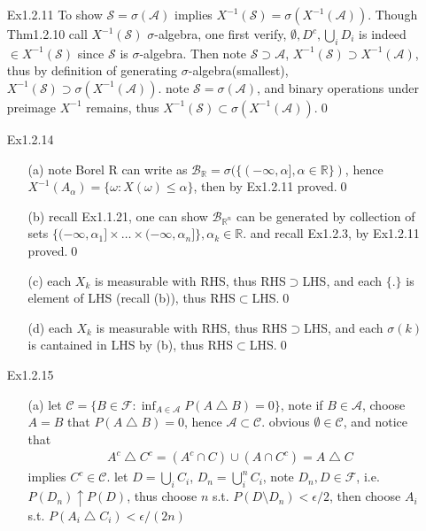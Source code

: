\documentclass[paper=a4, fontsize=11pt]{scrartcl} %
\numberwithin{equation}{section} %
\numberwithin{figure}{section} %
\numberwithin{table}{section} %
\begin{document}
\begin{itemize}
	 \item[Ex1.2.11] To show $\mathcal{S}=\sigma(\mathcal{A})$ implies $X^{-1}(\mathcal{S})=\sigma(X^{-1}(\mathcal{A}))$. Though Thm1.2.10 call $X^{-1}(\mathcal{S})$ $\sigma$-algebra, one first verify, $\emptyset,D^c,\bigcup_i D_i$ is indeed $\in X^{-1}(\mathcal{S})$ since $\mathcal{S}$ is $\sigma$-algebra. Then note $\mathcal{S}\supset \mathcal{A}$, $X^{-1}(\mathcal{S}) \supset X^{-1}(\mathcal{A})$, thus by definition of generating $\sigma$-algebra(smallest), $X^{-1}(\mathcal{S}) \supset \sigma(X^{-1}(\mathcal{A}))$. note $\mathcal{S}=\sigma(\mathcal{A})$, and binary operations under preimage $X^{-1}$ remains, thus $X^{-1}(\mathcal{S}) \subset \sigma(X^{-1}(\mathcal{A}))$.\qed
	 \item[Ex1.2.14]
	 \begin{itemize}
	 	\item[(a)] note Borel R can write as $\mathcal{B}_{\mathbb{R}}= \sigma(\{(-\infty,\alpha],\alpha\in \mathbb{R}\})$, hence $X^{-1}(A_\alpha) = \{\omega:X(\omega)\leq \alpha\}$, then by Ex1.2.11 proved.\qed
	 	\item[(b)] recall Ex1.1.21, one can show $\mathcal{B}_{\mathbb{R}^n}$ can be generated by collection of sets $\{(-\infty,\alpha_1]\times\dots\times(-\infty,\alpha_n]\},\alpha_k\in \mathbb{R}$. and recall Ex1.2.3, by Ex1.2.11 proved.\qed
	 	\item[(c)] each $X_k$ is measurable with RHS, thus RHS$\supset$LHS, and each $\{.\}$ is element of LHS (recall (b)), thus RHS$\subset$LHS.\qed
	 	\item[(d)] each $X_k$ is measurable with RHS, thus RHS$\supset$LHS, and each $\sigma(k)$ is cantained in LHS by (b), thus RHS$\subset$LHS.\qed
	 \end{itemize}
	 \item[Ex1.2.15]
	 \begin{itemize}
	 	\item[(a)] let $\mathcal{C}=\{B\in\mathcal{F}: \inf_{A\in\mathcal{A}} P(A\bigtriangleup B)=0\}$, note if $B\in\mathcal{A}$, choose $A=B$ that $P(A\bigtriangleup B)=0$, hence $\mathcal{A}\subset \mathcal{C}$. obvious $\emptyset\in \mathcal{C}$, and notice that
	 	\begin{align}
	 		A^c\bigtriangleup C^c = (A^c\cap C) \cup (A\cap C^c) = A \bigtriangleup C
	 	\end{align}
	 	implies $C^c\in \mathcal{C}$. let $D= \bigcup_i C_i$, $D_n= \bigcup_i^n C_i$, note $D_n,D\in\mathcal{F}$, i.e. $P(D_n)\uparrow P(D)$, thus choose $n$ s.t. $P(D\setminus D_n)< \epsilon/2$, then choose $A_i$ s.t. $P(A_i\bigtriangleup C_i)<\epsilon/(2n)$

\end{itemize}
\end{itemize}
\end{document}

